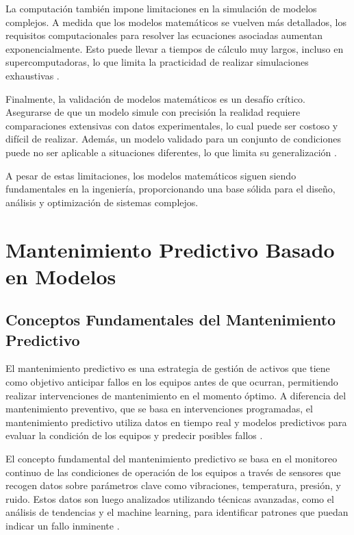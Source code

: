 La computación también impone limitaciones en la simulación de modelos complejos. A medida que los modelos matemáticos se vuelven más detallados, los requisitos computacionales para resolver las ecuaciones asociadas aumentan exponencialmente. Esto puede llevar a tiempos de cálculo muy largos, incluso en supercomputadoras, lo que limita la practicidad de realizar simulaciones exhaustivas \cite{roache1998verification}.

Finalmente, la validación de modelos matemáticos es un desafío crítico. Asegurarse de que un modelo simule con precisión la realidad requiere comparaciones extensivas con datos experimentales, lo cual puede ser costoso y difícil de realizar. Además, un modelo validado para un conjunto de condiciones puede no ser aplicable a situaciones diferentes, lo que limita su generalización \cite{oberkampf2010verification}.

A pesar de estas limitaciones, los modelos matemáticos siguen siendo fundamentales en la ingeniería, proporcionando una base sólida para el diseño, análisis y optimización de sistemas complejos.

\section{Mantenimiento Predictivo Basado en Modelos}

\subsection{Conceptos Fundamentales del Mantenimiento Predictivo}

El mantenimiento predictivo es una estrategia de gestión de activos que tiene como objetivo anticipar fallos en los equipos antes de que ocurran, permitiendo realizar intervenciones de mantenimiento en el momento óptimo. A diferencia del mantenimiento preventivo, que se basa en intervenciones programadas, el mantenimiento predictivo utiliza datos en tiempo real y modelos predictivos para evaluar la condición de los equipos y predecir posibles fallos \cite{mobley2002predictive}.

El concepto fundamental del mantenimiento predictivo se basa en el monitoreo continuo de las condiciones de operación de los equipos a través de sensores que recogen datos sobre parámetros clave como vibraciones, temperatura, presión, y ruido. Estos datos son luego analizados utilizando técnicas avanzadas, como el análisis de tendencias y el machine learning, para identificar patrones que puedan indicar un fallo inminente \cite{lee2014predictive}.

